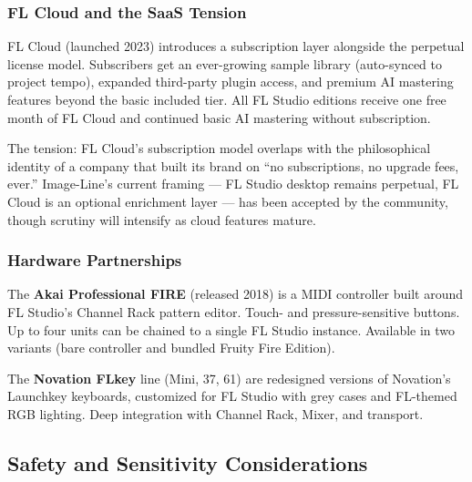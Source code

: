 \documentclass[11pt,letterpaper]{article}
\begin{document}
\subsubsection{FL Cloud and the SaaS Tension}

FL Cloud (launched 2023) introduces a subscription layer alongside the perpetual license model. Subscribers get an ever-growing sample library (auto-synced to project tempo), expanded third-party plugin access, and premium AI mastering features beyond the basic included tier. All FL Studio editions receive one free month of FL Cloud and continued basic AI mastering without subscription.

The tension: FL Cloud's subscription model overlaps with the philosophical identity of a company that built its brand on ``no subscriptions, no upgrade fees, ever.'' Image-Line's current framing --- FL Studio desktop remains perpetual, FL Cloud is an optional enrichment layer --- has been accepted by the community, though scrutiny will intensify as cloud features mature.

\subsubsection{Hardware Partnerships}

The \textbf{Akai Professional FIRE} (released 2018) is a MIDI controller built around FL Studio's Channel Rack pattern editor. Touch- and pressure-sensitive buttons. Up to four units can be chained to a single FL Studio instance. Available in two variants (bare controller and bundled Fruity Fire Edition).

The \textbf{Novation FLkey} line (Mini, 37, 61) are redesigned versions of Novation's Launchkey keyboards, customized for FL Studio with grey cases and FL-themed RGB lighting. Deep integration with Channel Rack, Mixer, and transport.

\subsection{Safety and Sensitivity Considerations}
\end{document}
